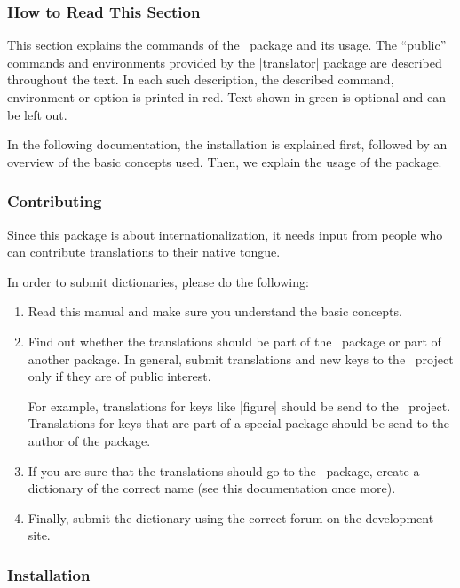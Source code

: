 \subsubsection{How to Read This Section}

This section explains the commands of the \translatorname\ package and its usage. The ``public'' commands and environments provided by the |translator| package are described throughout the text. In each such description, the described command, environment or option is printed in red. Text shown in green is optional and can be left out.

In the following documentation, the installation is explained first, followed by an overview of the basic concepts used. Then, we explain the usage of the package.

\subsubsection{Contributing}

Since this package is about internationalization, it needs input from people who can contribute translations to their native tongue.

In order to submit dictionaries, please do the following:
\begin{enumerate}
  \item Read this manual and make sure you understand the basic concepts.
  \item Find out whether the translations should be part of the \translatorname\ package or part of another package. In general, submit translations and new keys to the \translatorname\ project only if they are of public interest.

  For example, translations for keys like |figure| should be send to the \translatorname\ project. Translations for keys that are part of a special package should be send to the author of the package.
  \item If you are sure that the translations should go to the \translatorname\ package, create a dictionary of the correct name (see this documentation once more).
  \item Finally, submit the dictionary using the correct forum on the development site.
\end{enumerate}

\subsubsection{Installation}

